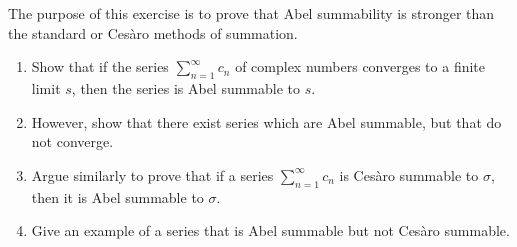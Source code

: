 \documentclass[12 pt, letterpaper]{hmcpset}
\begin{document}
\begin{problem}[S \& S \S 2.6 \#13.]
	The purpose of this exercise is to prove that Abel summability is stronger than the standard or Ces\`aro methods of summation.
	\begin{enumerate}
		\item Show that if the series $\sum_{n = 1}^{\infty} c_{n}$ of complex numbers converges to a finite limit $s$, then the series is Abel summable to $s$.
		\item However, show that there exist series which are Abel summable, but that do not converge.
		\item Argue similarly to prove that if a series $\sum_{n = 1}^{\infty} c_{n}$ is Ces\`aro summable to $\sigma$, then it is Abel summable to $\sigma$.
		\item Give an example of a series that is Abel summable but not Ces\`aro summable.
	\end{enumerate}
\end{problem}
\end{document}
